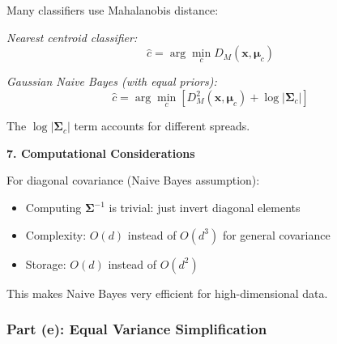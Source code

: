 \documentclass[12pt]{article}
\begin{document}
\begin{explanation}
Many classifiers use Mahalanobis distance:

\textit{Nearest centroid classifier:}
\[
\hat{c} = \arg\min_c D_M(\mathbf{x}, \boldsymbol{\mu}_c)
\]

\textit{Gaussian Naive Bayes (with equal priors):}
\[
\hat{c} = \arg\min_c \left[D_M^2(\mathbf{x}, \boldsymbol{\mu}_c) + \log|\boldsymbol{\Sigma}_c|\right]
\]

The $\log|\boldsymbol{\Sigma}_c|$ term accounts for different spreads.

\textbf{7. Computational Considerations}

For diagonal covariance (Naive Bayes assumption):
\begin{itemize}
    \item Computing $\boldsymbol{\Sigma}^{-1}$ is trivial: just invert diagonal elements
    \item Complexity: $O(d)$ instead of $O(d^3)$ for general covariance
    \item Storage: $O(d)$ instead of $O(d^2)$
\end{itemize}

This makes Naive Bayes very efficient for high-dimensional data.
\end{explanation}

\subsubsection{Part (e): Equal Variance Simplification}
\end{document}
